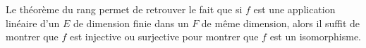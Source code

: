 \documentclass{magnolia}
\begin{document}
\begin{remarqueUnique}
\remarque Le théorème du rang permet de retrouver le fait que si $f$ est une
  application linéaire d'un \Kev $E$ de dimension finie dans un \Kev $F$ de
  même dimension, alors il suffit de montrer que $f$ est injective ou 
  surjective pour montrer que $f$ est un isomorphisme.
\end{remarqueUnique}
\end{document}
